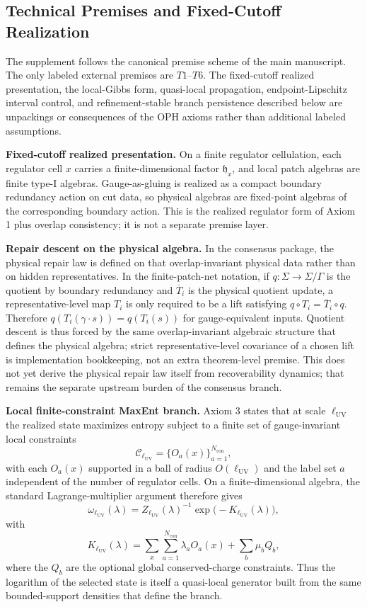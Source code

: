 \subsection{Technical Premises and Fixed-Cutoff Realization}\label{12-regulator-premises}

The supplement follows the canonical premise scheme of the main manuscript. The only labeled external premises are \(T1\)--\(T6\). The fixed-cutoff realized presentation, the local-Gibbs form, quasi-local propagation, endpoint-Lipschitz interval control, and refinement-stable branch persistence described below are unpackings or consequences of the OPH axioms rather than additional labeled assumptions.

\textbf{Fixed-cutoff realized presentation.} On a finite regulator cellulation, each regulator cell \(x\) carries a finite-dimensional factor \(\mathfrak h_x\), and local patch algebras are finite type-I algebras. Gauge-as-gluing is realized as a compact boundary redundancy action on cut data, so physical algebras are fixed-point algebras of the corresponding boundary action. This is the realized regulator form of Axiom 1 plus overlap consistency; it is not a separate premise layer.

\textbf{Repair descent on the physical algebra.} In the consensus package, the physical repair law
is defined on that overlap-invariant physical data rather than on hidden representatives. In the
finite-patch-net notation, if \(q:\Sigma\to\Sigma/\Gamma\) is the quotient by boundary redundancy
and \(\overline T_i\) is the physical quotient update, a representative-level map \(T_i\) is only
required to be a lift satisfying \(q\circ T_i=\overline T_i\circ q\). Therefore
\(q(T_i(\gamma\cdot s))=q(T_i(s))\) for gauge-equivalent inputs. Quotient descent is thus forced by
the same overlap-invariant algebraic structure that defines the physical algebra; strict
representative-level covariance of a chosen lift is implementation bookkeeping, not an extra
theorem-level premise. This does not yet derive the physical repair law itself from recoverability
dynamics; that remains the separate upstream burden of the consensus branch.

\textbf{Local finite-constraint MaxEnt branch.} Axiom 3 states that at scale \(\ell_{\mathrm{UV}}\) the realized state maximizes entropy subject to a finite set of gauge-invariant local constraints
\[
\mathcal C_{\ell_{\mathrm{UV}}}=\{O_a(x)\}_{a=1}^{N_{\mathrm{con}}},
\]
with each \(O_a(x)\) supported in a ball of radius \(O(\ell_{\mathrm{UV}})\) and the label set \(a\) independent of the number of regulator cells. On a finite-dimensional algebra, the standard Lagrange-multiplier argument therefore gives
\[
\omega_{\ell_{\mathrm{UV}}}(\lambda)
=
Z_{\ell_{\mathrm{UV}}}(\lambda)^{-1}
\exp\!\bigl(-K_{\ell_{\mathrm{UV}}}(\lambda)\bigr),
\]
with
\[
K_{\ell_{\mathrm{UV}}}(\lambda)
=
\sum_x \sum_{a=1}^{N_{\mathrm{con}}}\lambda_a O_a(x)
+\sum_b \mu_b Q_b,
\]
where the \(Q_b\) are the optional global conserved-charge constraints. Thus the logarithm of the selected state is itself a quasi-local generator built from the same bounded-support densities that define the branch.

